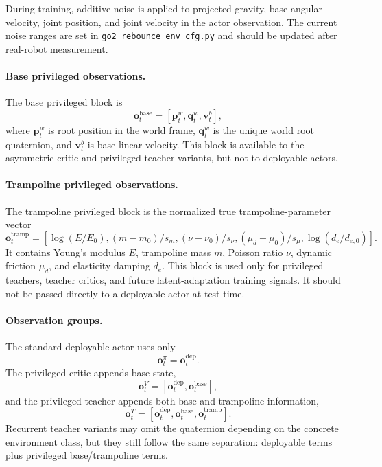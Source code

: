 \documentclass[11pt, a4paper]{article}
\begin{document}
During training, additive noise is applied to projected gravity, base angular
velocity, joint position, and joint velocity in the actor observation. The
current noise ranges are set in \texttt{go2\_rebounce\_env\_cfg.py} and should
be updated after real-robot measurement.

\paragraph{Base privileged observations.}
The base privileged block is
\begin{equation}
    \bm{o}^{\mathrm{base}}_t =
    \left[
        \bm{p}^{w}_t,
        \bm{q}^{w}_t,
        \bm{v}^{b}_t
    \right],
\end{equation}
where $\bm{p}^{w}_t$ is root position in the world frame, $\bm{q}^{w}_t$ is the
unique world root quaternion, and $\bm{v}^{b}_t$ is base linear velocity. This
block is available to the asymmetric critic and privileged teacher variants,
but not to deployable actors.

\paragraph{Trampoline privileged observations.}
The trampoline privileged block is the normalized true trampoline-parameter
vector
\begin{equation}
    \bm{o}^{\mathrm{tramp}}_t =
    \left[
        \log(E/E_0),
        (m-m_0)/s_m,
        (\nu-\nu_0)/s_\nu,
        (\mu_d-\mu_0)/s_\mu,
        \log(d_e/d_{e,0})
    \right].
\end{equation}
It contains Young's modulus $E$, trampoline mass $m$, Poisson ratio $\nu$,
dynamic friction $\mu_d$, and elasticity damping $d_e$. This block is used only
for privileged teachers, teacher critics, and future latent-adaptation training
signals. It should not be passed directly to a deployable actor at test time.

\paragraph{Observation groups.}
The standard deployable actor uses only
\[
    \bm{o}^{\pi}_t = \bm{o}^{\mathrm{dep}}_t.
\]
The privileged critic appends base state,
\[
    \bm{o}^{V}_t =
    \left[\bm{o}^{\mathrm{dep}}_t,\bm{o}^{\mathrm{base}}_t\right],
\]
and the privileged teacher appends both base and trampoline information,
\[
    \bm{o}^{T}_t =
    \left[
        \bm{o}^{\mathrm{dep}}_t,
        \bm{o}^{\mathrm{base}}_t,
        \bm{o}^{\mathrm{tramp}}_t
    \right].
\]
Recurrent teacher variants may omit the quaternion depending on the concrete
environment class, but they still follow the same separation: deployable terms
plus privileged base/trampoline terms.
\end{document}
